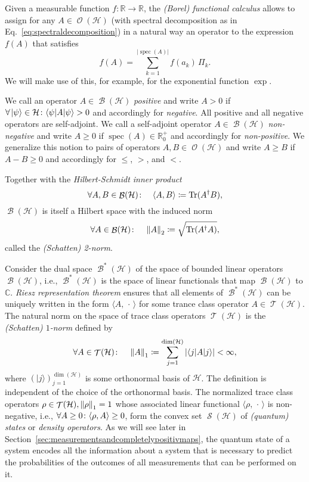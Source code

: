 \documentclass[a4paper,12pt,listof=totoc,index=totoc,bibliography=totoc,headsepline=false,headings=normal,BCOR16.153846mm,DIV12,headinclude,twoside,cleardoublepage=empty,numbers=noenddot,final]{scrreprt}
\theoremstyle{mystyle}
\numberwithin{equation}{section}
\numberwithin{figure}{section}
\numberwithin{lemma}{section}
\numberwithin{theorem}{section}
\numberwithin{corollary}{section}
\numberwithin{definition}{section}
\numberwithin{conjecture}{section}
\numberwithin{observation}{section}
\newcommand{\+}{\mkern2mu}
\newcommand{\coloneqq}{\mathrel{\vcentcolon\mkern-1.2mu=}} %
\newcommand{\texteqref}[1]{Eq.~\eqref{#1}}
\newcommand{\argdot}{{\,\cdot\,}}
\newcommand{\oftype}{\colon}
\newcommand{\itholds}{\colon\mathchoice{\quad}{}{}{}}
\newcommand{\bra}[1]{\langle #1|}
\newcommand{\ket}[1]{|#1\rangle}
\newcommand{\norm}[2][]{
  \ifthenelse{\equal{#1}{}}
    {\left\| {#2} \right\|}
    {\ifthenelse{\equal{#1}{uinv}}
      {\left\vert\kern-0.25ex\left\vert\kern-0.25ex\left\vert {#2} \right\vert\kern-0.25ex\right\vert\kern-0.25ex\right\vert}
      {\left\| {#2} \right\|_{#1}}
    }
}
\newcommand{\ad}{^\dagger}
\DeclareMathOperator{\1}{\mathds{1}}
\DeclareMathOperator{\Bop}{\mathcal{B}}
\DeclareMathOperator{\Tcl}{\mathcal{T}}
\DeclareMathOperator{\Obs}{\mathcal{O}}
\DeclareMathOperator{\Qst}{\mathcal{S}}
\DeclareMathOperator{\Tr}{Tr}
\DeclareMathOperator{\spec}{spec}
\newcommand{\mc}[1]{\mathcal{#1}}
\newcommand{\mcH}{\mc{H}}
\newcommand{\mb}[1]{\mathbb{#1}}
\newcommand{\R}{\mb{R}}
\renewcommand{\C}{\mb{C}} %
\begin{document}
Given a measurable function $f\oftype\R\to\R$, the \emph{(Borel) functional calculus} allows to assign for any $A \in \Obs(\mcH)$ (with spectral decomposition as in \texteqref{eq:spectraldecomposition}) in a natural way an operator to the expression $f(A)$ that satisfies
\begin{equation}
  f(A) = \sum_{k=1}^{|\spec(A)|} f(a_k)\,\Pi_k .
\end{equation}
We will make use of this, for example, for the exponential function $\exp$.

We call an operator $A \in \Bop(\mcH)$ \emph{positive} and write $A>0$ if $\forall\+\ket\psi\in\mcH\itholds\bra \psi A \ket \psi > 0$ and accordingly for \emph{negative}.
All positive and all negative operators are self-adjoint.
We call a self-adjoint operator $A \in \Bop(\mcH)$ \emph{non-negative} and write $A\geq0$ if $\spec(A) \in \R_0^+$ and accordingly for \emph{non-positive}.
We generalize this notion to pairs of operators $A,B\in\Obs(\mcH)$ and write $A \geq B$ if $A-B \geq 0$ and accordingly for $\leq$, $>$, and $<$.

Together with the \emph{Hilbert-Schmidt inner product} 
\begin{equation}
  \forall A,B \in \Bop(\mcH)\itholds \langle A,B\rangle \coloneqq \Tr(A\ad B),
\end{equation}
$\Bop(\mcH)$ is itself a Hilbert space with the induced norm
\begin{equation} \label{eq:twonorm}
  \forall A \in \Bop(\mcH)\itholds \norm[2]A \coloneqq \sqrt{\Tr(A\ad A)} ,
\end{equation}
called the \emph{(Schatten) 2-norm}.

Consider the dual space $\Bop^*(\mcH)$ of the space of bounded linear operators $\Bop(\mcH)$, i.e., $\Bop^*(\mcH)$ is the space of linear functionals that map $\Bop(\mcH)$ to $\C$.
\emph{Riesz representation theorem} ensures that all elements of $\Bop^*(\mcH)$ can be uniquely written in the form $\langle A,\argdot\rangle$ for some trance class operator $A \in \Tcl(\mcH)$.
The natural norm on the space of trace class operators $\Tcl(\mcH)$ is the \emph{(Schatten) $1$-norm} defined by
\begin{equation} \label{eq:onenorm}
  \forall A \in \Tcl(\mcH) \itholds \norm[1]A \coloneqq \sum_{j=1}^{\dim(\mcH)} | \bra j A \ket j | < \infty ,
\end{equation}
where $(\ket j)_{j=1}^{\dim(\mcH)}$ is some orthonormal basis of $\mcH$.
The definition is independent of the choice of the orthonormal basis.
The normalized trace class operators $\rho \in \Tcl(\mcH), \norm[1]\rho = 1$ whose associated linear functional $\langle \rho,\argdot\rangle$ is non-negative, i.e., $\forall A \geq 0\itholds \langle \rho,A\rangle \geq 0$, form the convex set $\Qst(\mcH)$ of \emph{(quantum) states} or \emph{density operators}.
As we will see later in Section~\ref{sec:measurementsandcompletelypositivmaps}, the quantum state of a system encodes all the information about a system that is necessary to predict the probabilities of the outcomes of all measurements that can be performed on it.
\end{document}
